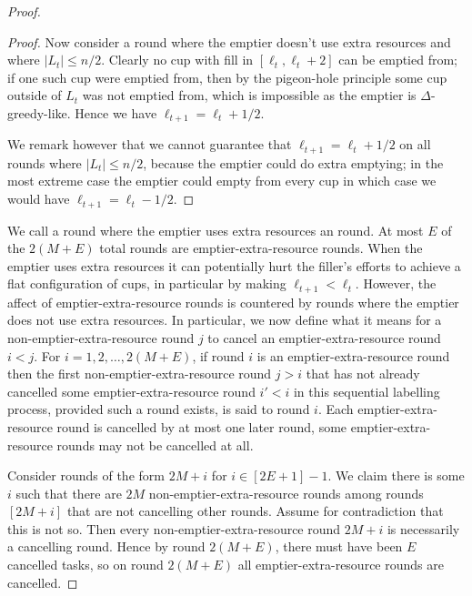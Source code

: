 \begin{proof}
\begin{proof}
    Now consider a round where the emptier doesn't use extra
    resources and where $|L_t| \le n/2$. 
    Clearly no cup with fill in $[\ell_t, \ell_t+2]$ can be
    emptied from; if one such cup were emptied from, then by the
    pigeon-hole principle some cup outside of $L_t$ was not
    emptied from, which is impossible as the emptier is
    $\Delta$-greedy-like. Hence we have $\ell_{t+1} =
    \ell_{t} + 1/2$.

    We remark however that we cannot guarantee that $\ell_{t+1} =
    \ell_t + 1/2$ on all rounds where $|L_t| \le n/2$, because the
    emptier could do extra emptying; in the most extreme case the
    emptier could empty from every cup in which case we
    would have $\ell_{t+1} = \ell_t - 1/2$. 
  \end{proof}
  
  We call a round where the emptier uses extra resources an
   round. At most $E$ of the
  $2(M+E)$ total rounds are emptier-extra-resource rounds. When
  the emptier uses extra resources it can potentially hurt the
  filler's efforts to achieve a flat configuration of cups, in
  particular by making $\ell_{t+1} < \ell_t$.
  However, the affect of emptier-extra-resource rounds is
  countered by rounds where the emptier does not use extra
  resources. In particular, we now define what it means for a
  non-emptier-extra-resource round $j$ to cancel an
  emptier-extra-resource round $i < j$. For $i = 1,2,\ldots,
  2(M+E)$, if round $i$ is an emptier-extra-resource round then
  the first non-emptier-extra-resource round $j > i$ that has not
  already cancelled some emptier-extra-resource round $i' < i$ in
  this sequential labelling process, provided such a round
  exists, is said to  round $i$. Each
  emptier-extra-resource round is cancelled by at most one later
  round, some emptier-extra-resource rounds may not be cancelled
  at all.

  Consider rounds of the form $2M + i$ for $i \in [2E+1]-1$. We
  claim there is some $i$ such that there are $2M$
  non-emptier-extra-resource rounds among rounds $[2M + i]$ that
  are not cancelling other rounds. Assume for contradiction that
  this is not so. Then every non-emptier-extra-resource round $2M + i$
  is necessarily a cancelling round. Hence by round $2(M + E)$,
  there must have been $E$ cancelled tasks, so on round $2(M+E)$
  all emptier-extra-resource rounds are cancelled.


\end{proof}

